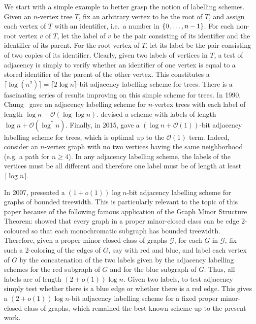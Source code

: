 \documentclass{patmorin}
\renewcommand{\geq}{\geqslant}
\newcommand{\vida}[1]{{\color{pink} VD: #1}}
\newcommand{\pat}[1]{\textcolor{Magenta}{PaMo: #1}}
\newcommand{\Oh}{\calO}
\DeclarePairedDelimiter{\set}{\{}{\}}
\newcommand{\calG}{\mathcal{G}}
\newcommand{\calO}{\mathcal{O}}
\begin{document}
We start with a simple example to better grasp the notion of labelling schemes. 
Given an $n$-vertex tree $T$, fix an arbitrary vertex to be the root of $T$, and assign each vertex of $T$ with an identifier, i.e.\ a number in $\set{0,\ldots,n-1}$.
For each non-root vertex $v$ of $T$,
let the label of $v$ be
the pair consisting of its identifier and the identifier of its parent.
For the root vertex of $T$, let its label be
the pair consisting of two copies of its identifier.
Clearly, given two labels of vertices in $T$,
a test of adjacency is simply to verify whether an identifier of one vertex is equal to a stored identifier of the parent of the other vertex.
This constitutes a $\lceil\log(n^2)\rceil=\lceil2\log n\rceil$-bit adjacency labelling scheme for trees.
There is a fascinating series of results improving on this simple scheme for trees. In 1990, Chung~\cite{chung:universal} gave an adjacency labelling scheme for $n$-vertex trees with each label of length $\log n +\Oh(\log\log n)$. 
\citet{alstrup.rauhe:improved} devised a scheme with labels of length $\log n+\Oh(\log^*n)$.
Finally, in 2015, 
\citet{alstrup.dahlgaard.ea:optimal} gave a $(\log n + \Oh(1))$-bit adjacency labelling scheme for trees, which is optimal up to the $\Oh(1)$ term.
Indeed, consider an $n$-vertex graph with no two vertices having the same neighborhood (e.g. a path for $n\geq4$).
In any adjacency labelling scheme,
the labels of the vertices must be all different and therefore one label must be of length at least $\lceil\log n\rceil$. 


In 2007, \citet{gavoille.labourel:shorter} presented
a $(1+o(1))\log n$-bit adjacency labelling scheme for graphs of bounded treewidth.
This is particularly relevant to the topic of this paper because of the following famous application of the Graph Minor Structure Theorem:
\citet{devos2004} showed that every graph
in a proper minor-closed class can be edge $2$-coloured so that each monochromatic subgraph
has bounded treewidth.
Therefore, given a proper minor-closed class of graphs $\calG$,
for each $G$ in $\calG$, fix such a $2$-coloring of the edges of $G$, say with red and blue, and label each vertex of $G$ by the concatenation of the two labels given by the adjacency labelling schemes for the red subgraph of $G$ and for the blue subgraph of $G$. Thus, all labels are of length $(2+o(1))\log n$.
Given two labels, to test adjacency simply test whether there is a blue edge or whether there is a red edge.
This gives a $(2+o(1))\log n$-bit adjacency labelling scheme for a fixed proper minor-closed class of graphs, which remained the best-known scheme up to the present work.
\end{document}
